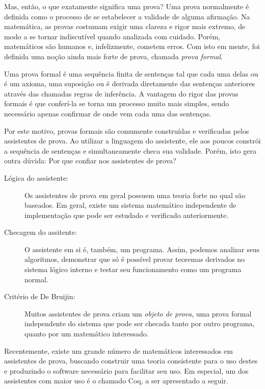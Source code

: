 Mas, então, o que exatamente significa uma prova? Uma prova normalmente é
definida como o processo de se estabelecer a validade de alguma afirmação. Na
matemática, as provas costumam exigir uma clareza e rigor mais extremo, de modo
a se tornar indiscutível quando analizada com cuidado. Porém, matemáticos são
humanos e, infelizmente, cometem erros. Com isto em mente, foi definida uma
noção ainda mais forte de prova, chamada \emph{prova formal}.

Uma prova formal é uma sequência finita de sentenças tal que cada uma delas ou é
um axioma, uma suposição ou é derivada diretamente das sentenças anteriores
através das chamadas regras de inferência. A vantagem do rigor das provas
formais é que conferí-la se torna um processo muito mais simples, sendo
necessário apenas confirmar de onde vem cada uma das sentenças.

Por este motivo, provas formais são comumente construídas e verificadas pelos
assistentes de prova. Ao utilizar a linguagem do assistente, ele aos poucos
constrói a sequência de sentenças e simultaneamente checa sua validade. Porém,
isto gera outra dúvida: Por que confiar nos assistentes de prova?


\begin{description}
    \item[Lógica do assistente:] Os assistentes de prova em geral possuem uma
        teoria forte no qual são baseados. Em geral, existe um sistema
        matemático independente de implementação que pode ser estudado e
        verificado anteriormente.
    \item[Checagem do assitente:] O assistente em si é, também, um programa. Assim,
        podemos analizar seus algoritmos, demonstrar que só é possível provar
        teoremas derivados no sistema lógico interno e testar seu funcionamento
        como um programa normal.
    \item[Critério de De Bruijin:] Muitos assistentes de prova criam um
        \emph{objeto de prova}, uma prova formal independente do sistema que
        pode ser checada tanto por outro programa, quanto por um matemático
        interessado.  
\end{description}

Recentemente, existe um grande número de matemáticos interessados em assistentes
de prova, buscando construir uma teoria consistente para o uso destes e
produzindo o software necessário para facilitar seu uso. Em especial, um dos
assistentes com maior uso é o chamado Coq, a ser apresentado a seguir.

